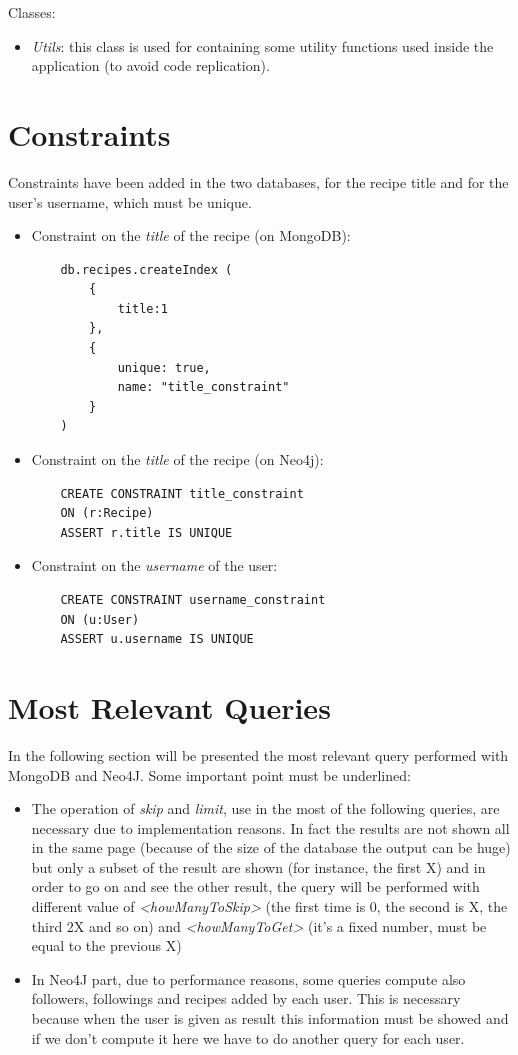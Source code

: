 \documentclass[a4paper]{report}
\begin{document}
\noindent Classes:
 \begin{itemize}
	\item \emph{Utils}: this class is used for containing some utility functions used inside the application (to avoid code replication).
\end{itemize}

\section{Constraints}
Constraints have been added in the two databases, for the recipe title and for the user's username, which must be unique.
\begin{itemize}
	\item Constraint on the \emph{title} of the recipe (on MongoDB): 
	\lstset{ language=java}
	\begin{lstlisting}
	db.recipes.createIndex (
		{
			title:1
		},
		{
			unique: true,
			name: "title_constraint"
		}
	)	
	\end{lstlisting} 
	\item Constraint on the \emph{title} of the recipe (on Neo4j): 
	\begin{lstlisting}
	CREATE CONSTRAINT title_constraint 
	ON (r:Recipe) 
	ASSERT r.title IS UNIQUE	
	\end{lstlisting} 
	\item Constraint on the \emph{username} of the user: 
	\lstset{ language=java}
	\begin{lstlisting}
	CREATE CONSTRAINT username_constraint 
	ON (u:User) 
	ASSERT u.username IS UNIQUE	
	\end{lstlisting} 
\end{itemize}
\section{Most Relevant Queries}
In the following section will be presented the most relevant query performed with MongoDB and Neo4J. 
\noindent Some important point must be underlined:
\begin{itemize}
	\item The operation of \emph{skip} and \emph{limit}, use in the most of the following queries, are necessary due  to implementation reasons. In fact the results are not shown all in the same page (because of the size of the database the output can be huge) but only a subset of the result are shown (for instance, the first X) and in order to go on and see the other result, the query will be performed with different value of \emph{<howManyToSkip>} (the first time is 0, the second is X, the third 2X and so on) and \emph{<howManyToGet>} (it's a fixed number, must be equal to the previous X)
	\item In Neo4J part, due to performance reasons, some queries compute also followers, followings and recipes added by each user. This is necessary because when the user is given as result this information must be showed and if we don't compute it here we have to do another query for each user.
\end{itemize}
\end{document}
